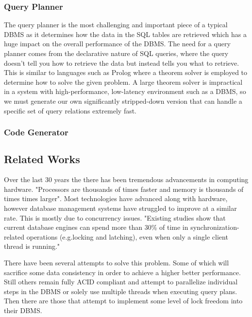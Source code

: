 \documentclass[letterpaper, 12pt]{article}
\begin{document}
\subsubsection{Query Planner}
The query planner is the most challenging and important piece of a typical DBMS as it
determines how the data in the SQL tables are retrieved which has a huge impact on 
the overall performance of the DBMS. The need for a query planner comes from the 
declarative nature of SQL queries, where the query doesn't tell you how to retrieve the
data but instead tells you what to retrieve. This is similar to languages such as Prolog where
a theorem solver is employed to determine how to solve the given problem. A large theorem 
solver is impractical in a system with high-performance, low-latency environment such as 
a DBMS, so we must generate our own significantly stripped-down version that can handle a 
specific set of query relations extremely fast.

\subsubsection{Code Generator}

\subsection{Related Works}
	Over the last 30 years the there has been tremendous advancements in computing
	hardware. "Processors are thousands of times faster and memory is thousands of
	times times larger"\cite{stonebraker2007end}. Most technologies have advanced 
	along with hardware, however database management systems have struggled to improve
	at a similar rate. This is mostly due to concurrency issues. "Existing studies show
	that current database engines can spend more than 30\% of time in 
	synchronization-related operations (e.g.locking and latching), even when only a 
	single client thread is running."\cite{soares2015database}
   \par\vspace{\baselineskip}
  	There have been several attempts to solve this problem. Some of which will sacrifice
  	some data consistency in order to achieve a higher better performance. Still others
  	remain fully ACID compliant and attempt to parallelize individual steps in the 
  	DBMS or solely use multiple threads when executing query plans. Then there are those
  	that attempt to implement some level of lock freedom into their DBMS.
  	\par\vspace{\baselineskip}
\end{document}

